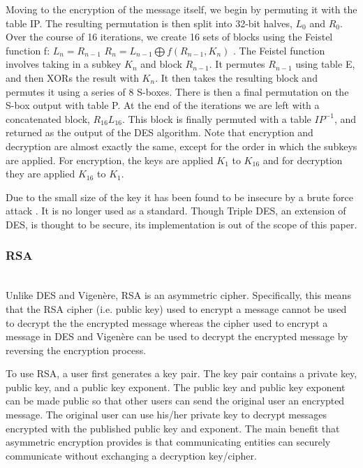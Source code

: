 \documentclass[acmlarge]{acmart}
\begin{document}
Moving to the encryption of the message itself, we begin by permuting it with the table IP. The resulting permutation is then split into 32-bit halves, $L_{0}$ and $R_{0}$. Over the course of 16 iterations, we create 16  sets of blocks using the Feistel function f:
$L_{n} = R_{n-1}$
$R_{n} = L_{n-1} \bigoplus f(R_{n-1}, K_{n})$ .
	The Feistel function involves taking in a subkey $K_{n}$ and block $R_{n - 1}$. It permutes $R_{n - 1}$ using table E, and then XORs the result with $K_{n}$. It then takes the resulting block and permutes it using a series of 8 S-boxes. There is then a final permutation on the S-box output with table P. At the end of the iterations we are left with a concatenated block, $R_{16}L_{16}$. This block is finally permuted with a table $IP^{-1}$, and returned as the output of the DES algorithm. Note that encryption and decryption are almost exactly the same, except for the order in which the subkeys are applied. For encryption, the keys are applied $K_{1}$ to $K_{16}$ and for decryption they are applied $K_{16}$ to $K_{1}$.

Due to the small size of the key it has been found to be insecure by a brute force attack \cite{DESCryptanalysis}. It is no longer used as a standard. Though Triple DES, an extension of DES, is thought to be secure, its implementation is out of the scope of this paper. 

\subsubsection{RSA}
\hspace*{\fill} \\ %
Unlike DES and Vigen\`{e}re, RSA is an asymmetric cipher. Specifically, this means that the RSA cipher (i.e. public key) used to encrypt a message cannot be used to decrypt the the encrypted message whereas the cipher used to encrypt a message in DES and Vigen\`{e}re can be used to decrypt the encrypted message by reversing the encryption process.
		
To use RSA, a user first generates a key pair. The key pair contains a private key, public key, and a public key exponent. The public key and public key exponent can be made public so that other users can send the original user an encrypted message. The original user can use his/her private key to decrypt messages encrypted with the published public key and exponent. The main benefit that asymmetric encryption provides is that communicating entities can securely communicate without exchanging a decryption key/cipher.
\end{document}
